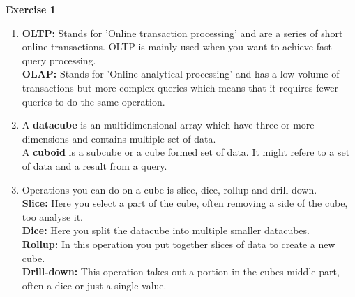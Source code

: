 {\bf \Huge Exercise 1}

\vspace{1cm}

\begin{enumerate}
	\item {\bf OLTP:} Stands for 'Online transaction processing' and are a series of short online transactions. OLTP is mainly used when you want to achieve fast query processing.\\
	{\bf OLAP:} Stands for 'Online analytical processing' and has a low volume of transactions but more complex queries which means that it requires fewer queries to do the same operation. 

	\item A {\bf datacube} is an multidimensional array which have three or more dimensions and contains multiple set of data.\\A {\bf cuboid} is a subcube or a cube formed set of data. It might refere to a set of data and a result from a query.

	\item Operations you can do on a cube is slice, dice, rollup and drill-down.\\
	{\bf Slice:} Here you select a part of the cube, often removing a side of the cube, too analyse it.\\
	{\bf Dice:} Here you split the datacube into multiple smaller datacubes.\\
	{\bf Rollup:} In this operation you put together slices of data to create a new cube.\\
	{\bf Drill-down:} This operation takes out a portion in the cubes middle part, often a dice or just a single value.\\
\end{enumerate}

